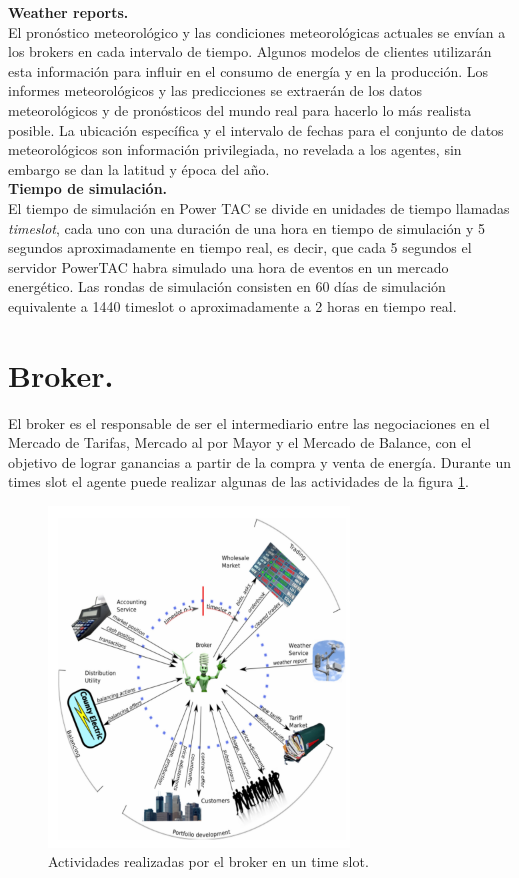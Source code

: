 \textbf{Weather reports.}\\

El pronóstico meteorológico y las condiciones meteorológicas actuales se envían a los brokers en cada intervalo de tiempo. Algunos modelos de clientes utilizarán esta información para influir en el consumo de energía y en la producción. Los informes meteorológicos y las predicciones se extraerán de los datos meteorológicos y de pronósticos del mundo real para hacerlo lo más realista posible. La ubicación específica y el intervalo de fechas para el conjunto de datos meteorológicos son información privilegiada, no revelada a los agentes, sin embargo se dan la latitud y época del año.\\

\textbf{Tiempo de simulación.}\\

El tiempo de simulación en Power TAC se divide en unidades de tiempo llamadas \textit{timeslot}, cada uno con una duración de una hora en tiempo de simulación y 5 segundos aproximadamente en tiempo real, es decir, que cada 5 segundos el servidor PowerTAC habra simulado una hora de eventos en un mercado energético.
Las rondas de simulación consisten en 60 días de simulación equivalente a 1440 timeslot o aproximadamente a 2 horas en tiempo real.\\

\section{Broker.}

El broker es el responsable de ser el intermediario entre las negociaciones en el Mercado de Tarifas, Mercado al por Mayor y el Mercado de Balance, con el objetivo de lograr ganancias a partir de la compra y venta de energía. Durante un times slot el agente puede realizar algunas de las actividades de la figura \ref{fig:activity}.

\begin{figure}[!h]
	\centering
	\includegraphics[width=8cm]{img/process.png}
	\caption{Actividades realizadas por el broker en un time slot.}
	\label{fig:activity}
\end{figure}

